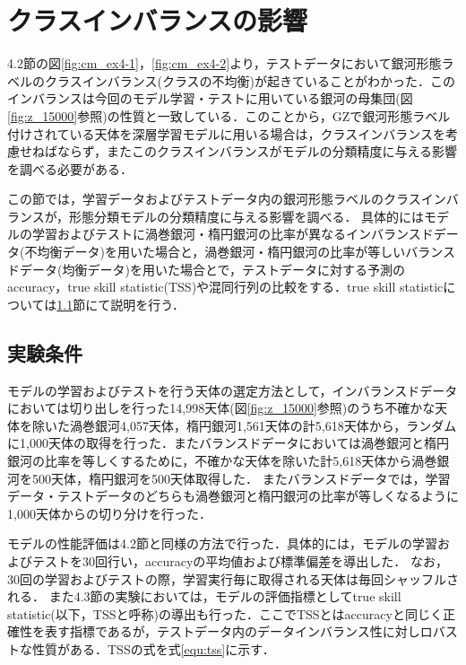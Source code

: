 \documentclass[a4j, 11pt]{jreport}
\begin{document}


\newpage
\section{クラスインバランスの影響}
4.2節の図\ref{fig:cm_ex4-1}，\ref{fig:cm_ex4-2}より，テストデータにおいて銀河形態ラベルのクラスインバランス(クラスの不均衡)が起きていることがわかった．このインバランスは今回のモデル学習・テストに用いている銀河の母集団(図\ref{fig:z_15000}参照)の性質と一致している．このことから，GZで銀河形態ラベル付けされている天体を深層学習モデルに用いる場合は，クラスインバランスを考慮せねばならず，またこのクラスインバランスがモデルの分類精度に与える影響を調べる必要がある．

この節では，学習データおよびテストデータ内の銀河形態ラベルのクラスインバランスが，形態分類モデルの分類精度に与える影響を調べる．
具体的にはモデルの学習およびテストに渦巻銀河・楕円銀河の比率が異なるインバランスドデータ(不均衡データ)を用いた場合と，渦巻銀河・楕円銀河の比率が等しいバランスドデータ(均衡データ)を用いた場合とで，テストデータに対する予測のaccuracy，true skill statistic(TSS)や混同行列の比較をする．true skill statisticについては\ref{sec:4-3-1}節にて説明を行う．

\subsection{実験条件}
\label{sec:4-3-1}
モデルの学習およびテストを行う天体の選定方法として，インバランスドデータにおいては切り出しを行った14,998天体(図\ref{fig:z_15000}参照)のうち不確かな天体を除いた渦巻銀河4,057天体，楕円銀河1,561天体の計5,618天体から，ランダムに1,000天体の取得を行った．またバランスドデータにおいては渦巻銀河と楕円銀河の比率を等しくするために，不確かな天体を除いた計5,618天体から渦巻銀河を500天体，楕円銀河を500天体取得した．
またバランスドデータでは，学習データ・テストデータのどちらも渦巻銀河と楕円銀河の比率が等しくなるように1,000天体からの切り分けを行った．

モデルの性能評価は4.2節と同様の方法で行った．具体的には，モデルの学習およびテストを30回行い，accuracyの平均値および標準偏差を導出した．
なお，30回の学習およびテストの際，学習実行毎に取得される天体は毎回シャッフルされる．
また4.3節の実験においては，モデルの評価指標としてtrue skill statistic(以下，TSSと呼称)の導出も行った．ここでTSSとはaccuracyと同じく正確性を表す指標であるが，テストデータ内のデータインバランス性に対しロバストな性質がある．TSSの式を式\ref{equ:tss}に示す．
\end{document}
